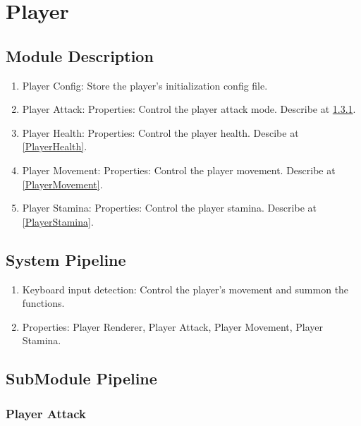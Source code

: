 \section{Player}

\subsection{Module Description}

\begin{enumerate}
	\item Player Config: Store the player's initialization config file.
	\item Player Attack: Properties: Control the player attack mode. Describe at \ref{PlayerAttack}.
	\item Player Health: Properties: Control the player health. Descibe at \ref{PlayerHealth}.
	\item Player Movement: Properties: Control the player movement. Describe at \ref{PlayerMovement}.
	\item Player Stamina: Properties: Control the player stamina. Describe at \ref{PlayerStamina}.
\end{enumerate}

\subsection{System Pipeline}

\begin{enumerate}
	\item Keyboard input detection: Control the player's movement and summon the functions.
	\item Properties: Player Renderer, Player Attack, Player Movement, Player Stamina.
\end{enumerate}

\subsection{SubModule Pipeline}

\subsubsection{Player Attack}\label{PlayerAttack}

